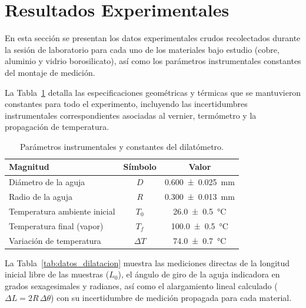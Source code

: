 
    \section{Resultados Experimentales}
    \label{sec:resultados}

    En esta sección se presentan los datos experimentales crudos recolectados durante la sesión de laboratorio para cada uno de los materiales bajo estudio (cobre, aluminio y vidrio borosilicato), así como los parámetros instrumentales constantes del montaje de medición.

    La Tabla~\ref{tab:parametros_sistema} detalla las especificaciones geométricas y térmicas que se mantuvieron constantes para todo el experimento, incluyendo las incertidumbres instrumentales correspondientes asociadas al vernier, termómetro y la propagación de temperatura.

    \begin{table}[H]
        \centering
        \caption{Parámetros instrumentales y constantes del dilatómetro.}
        \label{tab:parametros_sistema}
        \begin{tabular}{lcc}
            \toprule
            \textbf{Magnitud} & \textbf{Símbolo} & \textbf{Valor} \\
            \midrule
            Diámetro de la aguja & $D$ & \qty{0,600 \pm 0,025}{\milli\meter} \\
            Radio de la aguja & $R$ & \qty{0,300 \pm 0,013}{\milli\meter} \\
            Temperatura ambiente inicial & $T_0$ & \qty{26,0 \pm 0,5}{\celsius} \\
            Temperatura final (vapor) & $T_f$ & \qty{100,0 \pm 0,5}{\celsius} \\
            Variación de temperatura & $\Delta T$ & \qty{74,0 \pm 0,7}{\celsius} \\
            \bottomrule 
        \end{tabular}
    \end{table}

    La Tabla~\ref{tab:datos_dilatacion} muestra las mediciones directas de la longitud inicial libre de las muestras ($L_0$), el ángulo de giro de la aguja indicadora en grados sexagesimales y radianes, así como el alargamiento lineal calculado ($\Delta L = 2R\,\Delta\theta$) con su incertidumbre de medición propagada para cada material.


